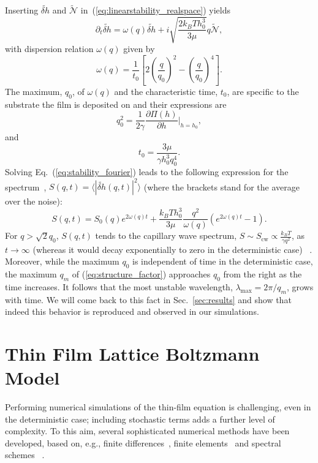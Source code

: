 Inserting $\tilde{\delta h}$ and $\tilde{\mathcal{N}}$ in~(\ref{eq:linearstability_realspace}) yields
\begin{equation}\label{eq:stability_fourier}
    \partial_t \tilde{\delta h} = \omega(q)\tilde{\delta h} +i\sqrt{\frac{2k_BTh_0^3}{3\mu}}q\tilde{\mathcal{N}},
\end{equation}
with dispersion relation $\omega(q)$ given by
\begin{equation}\label{eq:dispersion}
    \omega(q) = \frac{1}{t_0}\left[2\left(\frac{q}{q_0}\right)^2 - \left(\frac{q}{q_0}\right)^4\right].
\end{equation}
The maximum, $q_0$, of $\omega(q)$ and the characteristic time, $t_0$, are specific to the substrate the film is deposited on and their expressions are~\cite{PhysRevLett.99.114503}
\begin{equation}\label{eq:q0}
    q_0^2 = \frac{1}{2\gamma}\frac{\partial \Pi(h)}{\partial h}\bigg\rvert_{h=h_0},
\end{equation}
and
\begin{equation}\label{eq:t0}
    t_0 = \frac{3\mu}{\gamma h_0^3 q_0^4}.
\end{equation}
Solving Eq.~(\ref{eq:stability_fourier}) leads to the following expression for the spectrum~\cite{PhysRevE.100.023108,Mecke_2005},
$S(q,t) = \langle |\tilde{\delta h}(q,t)|^2\rangle$ (where the brackets stand for the average over the noise):
\begin{equation}\label{eq:structure_factor}
    S(q,t) = S_0(q)e^{2\omega(q)t} + \frac{k_BTh_0^3}{3\mu}\frac{q^2}{\omega(q)}(e^{2\omega(q)t} - 1).
\end{equation}
For $q>\sqrt{2}q_0$, $S(q,t)$ tends to the capillary wave spectrum, 
$S \sim S_{\text{cw}} \propto \frac{k_BT}{\gamma q^2}$, as $t \rightarrow \infty$ (whereas it would decay exponentially to zero in the deterministic case) ~\cite{PhysRevLett.99.114503,Mecke_2005}.
Moreover, while the maximum $q_0$ is independent of time in the deterministic case, the maximum $q_m$ of 
(\ref{eq:structure_factor}) approaches $q_0$ from the right as the time increases.
It follows that the most unstable wavelength, $\lambda_{\text{max}} = 2\pi/q_m$, grows with time.
We will come back to this fact in Sec.~\ref{sec:results} and show that indeed this behavior is reproduced and observed in our simulations.

\section{Thin Film Lattice Boltzmann Model}\label{sec:num_method}
Performing numerical simulations of the thin-film equation is challenging, even in the deterministic case;
including stochastic terms adds a further level of complexity.
To this aim, several sophisticated numerical methods have been developed, based on, e.g.,   
finite differences~\cite{PhysRevE.63.011208}, finite elements~\cite{Grun2006} and spectral schemes~\cite{Duran_Olivencia2019} . 

